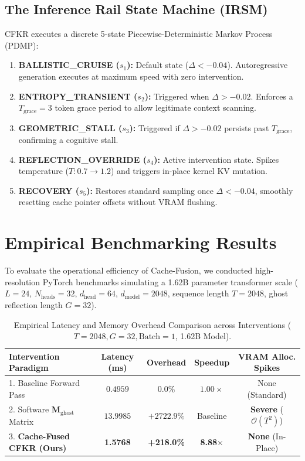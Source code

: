 \documentclass[11pt,twocolumn]{article}
\begin{document}
\begin{enumerate}
\subsection{The Inference Rail State Machine (IRSM)}
CFKR executes a discrete 5-state Piecewise-Deterministic Markov Process (PDMP):
\begin{enumerate}
    \item \textbf{BALLISTIC\_CRUISE ($s_1$):} Default state ($\Delta < -0.04$). Autoregressive generation executes at maximum speed with zero intervention.
    \item \textbf{ENTROPY\_TRANSIENT ($s_2$):} Triggered when $\Delta > -0.02$. Enforces a $T_{\text{grace}} = 3$ token grace period to allow legitimate context scanning.
    \item \textbf{GEOMETRIC\_STALL ($s_3$):} Triggered if $\Delta > -0.02$ persists past $T_{\text{grace}}$, confirming a cognitive stall.
    \item \textbf{REFLECTION\_OVERRIDE ($s_4$):} Active intervention state. Spikes temperature ($T: 0.7 \to 1.2$) and triggers in-place kernel KV mutation.
    \item \textbf{RECOVERY ($s_5$):} Restores standard sampling once $\Delta < -0.04$, smoothly resetting cache pointer offsets without VRAM flushing.
\end{enumerate}

\section{Empirical Benchmarking Results}

To evaluate the operational efficiency of Cache-Fusion, we conducted high-resolution PyTorch benchmarks simulating a 1.62B parameter transformer scale ($L=24$, $N_{\text{heads}}=32$, $d_{\text{head}}=64$, $d_{\text{model}}=2048$, sequence length $T=2048$, ghost reflection length $G=32$).

\begin{table}[h]
\centering
\caption{Empirical Latency and Memory Overhead Comparison across Interventions ($T=2048, G=32, \text{Batch}=1$, 1.62B Model).}
\label{tab:benchmark}
\small
\begin{tabular}{lcccc}
\toprule
\textbf{Intervention Paradigm} & \textbf{Latency (ms)} & \textbf{Overhead} & \textbf{Speedup} & \textbf{VRAM Alloc. Spikes} \\
\midrule
1. Baseline Forward Pass & $0.4959$ & $0.0\%$ & $1.00\times$ & None (Standard) \\
2. Software $\mathbf{M}_{\text{ghost}}$ Matrix & $13.9985$ & $+2722.9\%$ & Baseline & \textbf{Severe} ($\mathcal{O}(T^2)$) \\
3. \textbf{Cache-Fused CFKR (Ours)} & \textbf{1.5768} & \textbf{+218.0\%} & \textbf{8.88$\times$} & \textbf{None} (In-Place) \\
\bottomrule
\end{tabular}
\end{table}


\end{enumerate}
\end{document}
